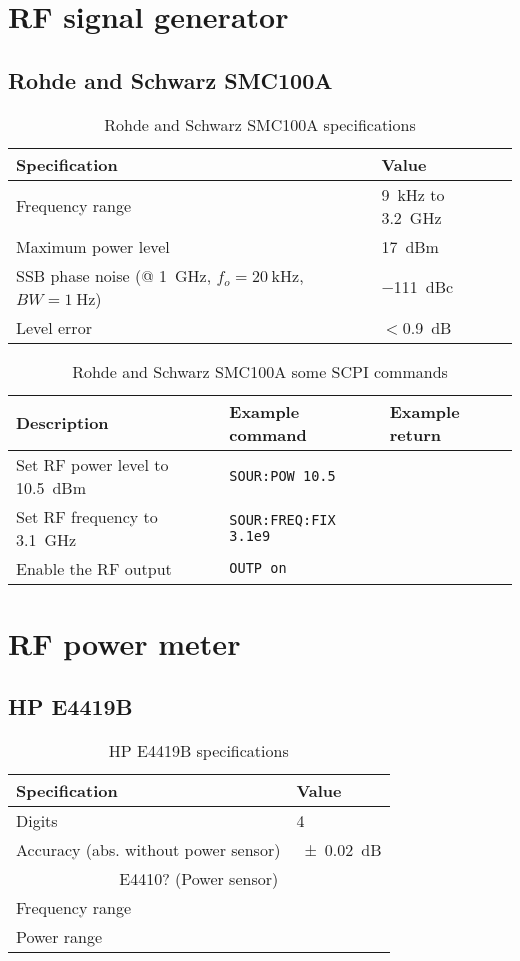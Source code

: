 \section{RF signal generator}
\subsection{Rohde and Schwarz SMC100A}
\begin{table}[H]
	\centering
	\caption{Rohde and Schwarz SMC100A specifications}
	\label{tab:rs-smc100a-specs}
	\begin{tabular}{ll}
		\toprule
		\textbf{Specification} & \textbf{Value}\\
		\midrule
		Frequency range & \SI{9}{\kHz} to \SI{3.2}{\GHz}\\
		Maximum power level & \SI{17}{dBm}\\
		SSB phase noise (@ \SI{1}{\GHz}, $f_o=\SI{20}{\kHz}$, $BW=\SI{1}{\Hz}$) & \SI{-111}{dBc}\\
		Level error & $<$\SI{0.9}{\dB}\\
		\bottomrule
	\end{tabular}
\end{table}

\begin{table}[H]
	\centering
	\caption{Rohde and Schwarz SMC100A some SCPI commands}
	\label{tab:rs-smc100a-scpi}
	\begin{tabularx}{\textwidth}{Xll}
		\toprule
		\textbf{Description} & \textbf{Example command} & \textbf{Example return}\\
		\midrule
		Set RF power level to \SI{10.5}{dBm} & \texttt{SOUR:POW 10.5} & \\
		Set RF frequency to \SI{3.1}{\GHz}& \texttt{SOUR:FREQ:FIX {3.1e9}} & \\
		Enable the RF output & \texttt{OUTP on} & \\
		\bottomrule
	\end{tabularx}
\end{table}

\section{RF power meter}
\subsection{HP E4419B}
\begin{table}[H]
	\centering
	\caption{HP E4419B specifications}
	\label{tab:hp-E4419B-specs}
	\begin{tabular}{ll}
		\toprule
		\textbf{Specification} & \textbf{Value}\\
		\midrule
		Digits & 4\\
		Accuracy (abs. without power sensor) & \SI{+-0.02}{\dB} \\
		\multicolumn{2}{c}{E4410? (Power sensor)}\\
		Frequency range & \\
		Power range & \\
		\bottomrule
	\end{tabular}
\end{table}

